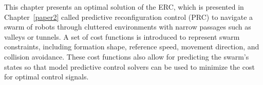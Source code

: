 This chapter presents an optimal solution of the ERC, which is presented in Chapter~\ref{paper2} called predictive reconfiguration control (PRC) to navigate a swarm of robots through cluttered environments with narrow passages such as valleys or tunnels. A set of cost functions is introduced to represent swarm constraints, including formation shape, reference speed, movement direction, and collision avoidance. These cost functions also allow for predicting the swarm's states so that model predictive control solvers can be used to minimize the cost for optimal control signals.







